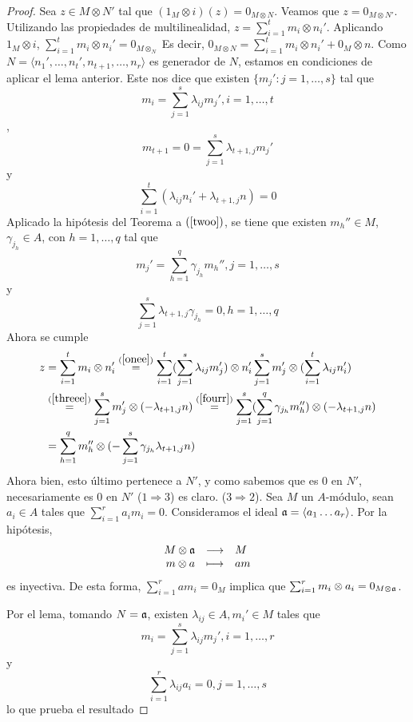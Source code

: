 \documentclass[../main.tex]{subfiles}
\begin{document}
\begin{proof}
	Sea $z\in M\otimes N'$ tal que $(1_M\otimes i)(z)=0_{M\otimes N}$. Veamos que $z=0_{M\otimes N'}$. Utilizando las propiedades de multilinealidad, $z=\sum_{i=1}^tm_i\otimes n_i'$. Aplicando $1_M\otimes i$, $\sum_{i=1}^tm_i\otimes n_i'=0_{M\otimes_N}$ Es decir, $0_{M\otimes N}=\sum_{i=1}^tm_i\otimes n_i'+0_M\otimes n$. Como $N=\langle n_1',\dots,n_t',n_{t+1},\dots,n_r\rangle$ es generador de $N$, estamos en condiciones de aplicar el lema anterior. Este nos dice que existen $\{m_j':j=1,\dots,s\}$ tal que \begin{equation} \label{onee}
	m_i=\sum_{j=1}^s\lambda_{ij}m_j', i=1,\dots,t
	\end{equation}, \begin{equation} \label{twoo}
	m_{t+1}=0=\sum_{j=1}^s\lambda_{t+1,j}m_j'
	\end{equation} y \begin{equation} \label{threee}
	\sum_{i=1}^t(\lambda_{ij}n_i'+\lambda_{t+1,j}n)=0
	\end{equation} Aplicado la hipótesis del Teorema a $(\ref{twoo})$, se tiene que existen $m_h''\in M$, $\gamma_{j_h}\in A$, con $h=1,\dots,q$ tal que \begin{equation} \label{fourr}
	m_j'=\sum_{h=1}^q\gamma_{j_h}m_h'', j=1,\dots,s
	\end{equation} y \begin{equation} \label{fivee}
	\sum_{j=1}^s\lambda_{t+1,j}\gamma_{j_h}=0, h=1,\dots,q    \end{equation}
	Ahora se cumple 
	\begin{align*}
	z&=\sum_{i=1}^tm_i\otimes n_i'\overset{(\ref{onee})}{=}\sum_{i=1}^t(\sum_{j=1}^s\lambda_{ij}m_j')\otimes n_i'\sum_{j=1}^sm_j'\otimes(\sum_{i=1}^t\lambda_{ij}n_i')\\
	&\overset{(\ref{threee})}{=}\sum_{j=1}^sm_j'\otimes(-\lambda_{t+1,j}n)\overset{(\ref{fourr})}{=}\sum_{j=1}^s(\sum_{j=1}^q\gamma_{j_h}m_h'')\otimes (-\lambda_{t+1,j}n)\\
	&=\sum_{h=1}^qm_h''\otimes(-\sum_{j=1}^s\gamma_{j_h}\lambda_{t+1,j}n)
	\end{align*}
	Ahora bien, esto último pertenece a $N'$, y como sabemos que es $0$ en $N'$, necesariamente es $0$ en $N'$
	($1\Rightarrow3$) es claro.
	($3\Rightarrow2$). Sea $M$ un $A$-módulo, sean $a_i\in A$ tales que $\sum_{i=1}^ra_im_i=0$. Consideramos el ideal $\mathfrak{a}=\langle a_1\dots a_r\rangle$. Por la hipótesis, 
	$$\begin{array}{rcl}
	M\otimes\mathfrak{a}&\longrightarrow&M  \\
	m\otimes a&\longmapsto&am
	\end{array}$$ es inyectiva. De esta forma, $\sum_{i=1}^ram_i=0_M$ implica que $\sum_{i=1}^rm_i\otimes a_i=0_{M\otimes\mathfrak{a}}$.
	
	Por el lema, tomando $N=\mathfrak{a}$, existen $\lambda_{ij}\in A, m_i'\in M$ tales que $$m_i=\sum_{j=1}^s\lambda_{ij}m_j', i=1,\dots,r$$ y $$\sum_{i=1}^r\lambda_{ij}a_i=0, j=1,\dots,s$$ lo que prueba el resultado 
\end{proof}
\end{document}

